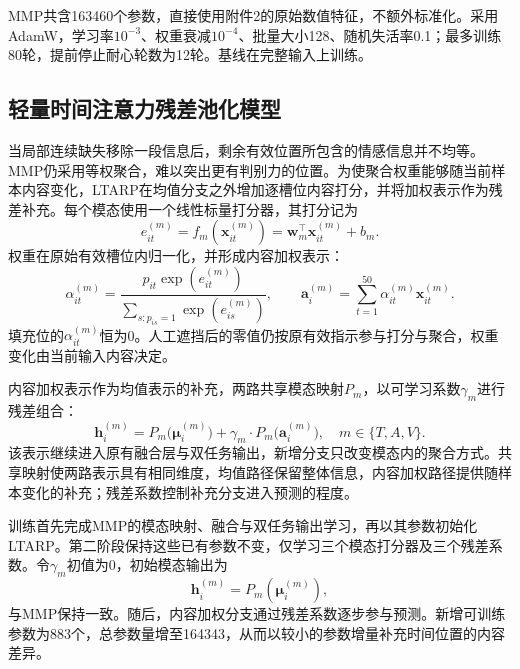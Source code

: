 \QTwoParagraph MMP共含163460个参数，直接使用附件2的原始数值特征，不额外标准化。采用AdamW，学习率$10^{-3}$、权重衰减$10^{-4}$、批量大小128、随机失活率0.1；最多训练80轮，提前停止耐心轮数为12轮。基线在完整输入上训练。

\subsection{轻量时间注意力残差池化模型}\label{subsec:q2_pool}
\QTwoParagraph 当局部连续缺失移除一段信息后，剩余有效位置所包含的情感信息并不均等。MMP仍采用等权聚合，难以突出更有判别力的位置。为使聚合权重能够随当前样本内容变化，LTARP在均值分支之外增加逐槽位内容打分，并将加权表示作为残差补充。每个模态使用一个线性标量打分器，其打分记为
\begin{equation}
e_{it}^{(m)} = f_m(\mathbf x_{it}^{(m)}) = \mathbf w_m^\top\mathbf x_{it}^{(m)} + b_m.
\end{equation}
权重在原始有效槽位内归一化，并形成内容加权表示：
\begin{equation}
\alpha_{it}^{(m)} = \frac{p_{it}\exp(e_{it}^{(m)})}{\sum_{s: p_{is}=1} \exp(e_{is}^{(m)})},\qquad
\mathbf a_i^{(m)} = \sum_{t=1}^{50} \alpha_{it}^{(m)} \mathbf x_{it}^{(m)}.
\label{eq:q2_alpha_softmax}
\end{equation}
填充位的$\alpha_{it}^{(m)}$恒为0。人工遮挡后的零值仍按原有效指示参与打分与聚合，权重变化由当前输入内容决定。

\QTwoParagraph 内容加权表示作为均值表示的补充，两路共享模态映射$P_m$，以可学习系数$\gamma_m$进行残差组合：
\begin{equation}
\mathbf h_i^{(m)} = P_m\big(\boldsymbol\mu_i^{(m)}\big) + \gamma_m \cdot P_m\big(\mathbf a_i^{(m)}\big), \quad m \in \{T, A, V\}.
\label{eq:q2_residual_composite}
\end{equation}
该表示继续进入原有融合层与双任务输出，新增分支只改变模态内的聚合方式。共享映射使两路表示具有相同维度，均值路径保留整体信息，内容加权路径提供随样本变化的补充；残差系数控制补充分支进入预测的程度。

\QTwoParagraph 训练首先完成MMP的模态映射、融合与双任务输出学习，再以其参数初始化LTARP。第二阶段保持这些已有参数不变，仅学习三个模态打分器及三个残差系数。令$\gamma_m$初值为0，初始模态输出为
\begin{equation}
\mathbf h_i^{(m)} = P_m(\boldsymbol\mu_i^{(m)}),
\end{equation}
与MMP保持一致。随后，内容加权分支通过残差系数逐步参与预测。新增可训练参数为883个，总参数量增至164343，从而以较小的参数增量补充时间位置的内容差异。

